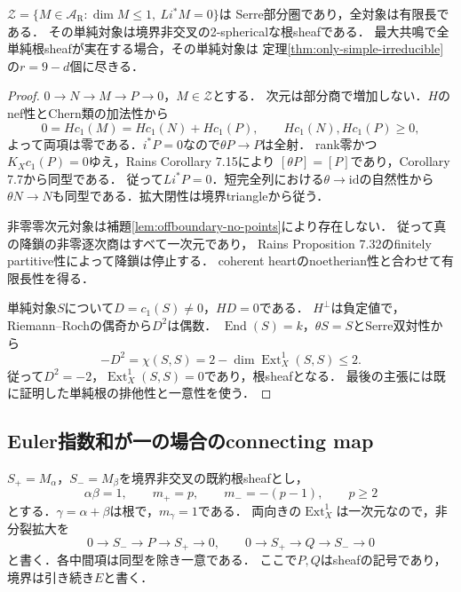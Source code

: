 \begin{proposition}[境界外圏の有限長性]
\label{prop:offboundary-serre-length}
$\mathcal Z=\{M\in\mathcal A_{\mathrm R}:\dim M\le1,\ Li^*M=0\}$は
Serre部分圏であり，全対象は有限長である．
その単純対象は境界非交叉の2-sphericalな根sheafである．
最大共鳴で全単純根sheafが実在する場合，その単純対象は
定理\ref{thm:only-simple-irreducible}の$r=9-d$個に尽きる．
\end{proposition}
\begin{proof}
$0\to N\to M\to P\to0$，$M\in\mathcal Z$とする．
次元は部分商で増加しない．$H$のnef性とChern類の加法性から
\[
0=Hc_1(M)=Hc_1(N)+Hc_1(P),\qquad Hc_1(N),Hc_1(P)\ge0,
\]
よって両項は零である．$i^*P=0$なので$\theta P\to P$は全射．
rank零かつ$K_Xc_1(P)=0$ゆえ，Rains Corollary 7.15により
$[\theta P]=[P]$であり，Corollary 7.7から同型である．
従って$Li^*P=0$．短完全列における$\theta\to\mathrm{id}$の自然性から
$\theta N\to N$も同型である．拡大閉性は境界triangleから従う．

非零零次元対象は補題\ref{lem:offboundary-no-points}により存在しない．
従って真の降鎖の非零逐次商はすべて一次元であり，
Rains Proposition 7.32のfinitely partitive性によって降鎖は停止する．
coherent heartのnoetherian性と合わせて有限長性を得る．

単純対象$S$について$D=c_1(S)\ne0$，$HD=0$である．
$H^\perp$は負定値で，Riemann--Rochの偶奇から$D^2$は偶数．
$\operatorname{End}(S)=k$，$\theta S=S$とSerre双対性から
\[
-D^2=\chi(S,S)=2-\dim\operatorname{Ext}_X^1(S,S)\le2.
\]
従って$D^2=-2$，$\operatorname{Ext}_X^1(S,S)=0$であり，根sheafとなる．
最後の主張には既に証明した単純根の排他性と一意性を使う．
\end{proof}

\subsection{Euler指数和が一の場合のconnecting map}
$S_+=M_\alpha$，$S_-=M_\beta$を境界非交叉の既約根sheafとし，
\[
\alpha\beta=1,\qquad m_+=p,\qquad m_-=-(p-1),\qquad p\ge2
\]
とする．$\gamma=\alpha+\beta$は根で，$m_\gamma=1$である．
両向きの$\operatorname{Ext}_X^1$は一次元なので，非分裂拡大を
\begin{equation}\label{eq:a2-two-extensions}
0\to S_-\to P\to S_+\to0,\qquad
0\to S_+\to Q\to S_-\to0
\end{equation}
と書く．各中間項は同型を除き一意である．
ここで$P,Q$はsheafの記号であり，境界は引き続き$E$と書く．

